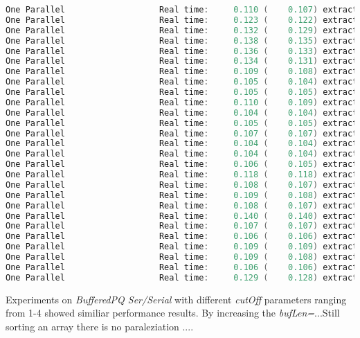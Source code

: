 \documentclass[format=acmsmall, review=false, screen=true]{acmart}
\begin{document}
\begin{lstlisting}[language=java]
One Parallel                   Real time:     0.110 (    0.107) extract: 1666666
One Parallel                   Real time:     0.123 (    0.122) extract: 1250000
One Parallel                   Real time:     0.132 (    0.129) extract: 1000000
One Parallel                   Real time:     0.138 (    0.135) extract: 833333
One Parallel                   Real time:     0.136 (    0.133) extract: 714285
One Parallel                   Real time:     0.134 (    0.131) extract: 625000
One Parallel                   Real time:     0.109 (    0.108) extract: 555555
One Parallel                   Real time:     0.105 (    0.104) extract: 500000
One Parallel                   Real time:     0.105 (    0.105) extract: 454545
One Parallel                   Real time:     0.110 (    0.109) extract: 416666
One Parallel                   Real time:     0.104 (    0.104) extract: 384615
One Parallel                   Real time:     0.105 (    0.105) extract: 357142
One Parallel                   Real time:     0.107 (    0.107) extract: 333333
One Parallel                   Real time:     0.104 (    0.104) extract: 312500
One Parallel                   Real time:     0.104 (    0.104) extract: 294117
One Parallel                   Real time:     0.106 (    0.105) extract: 277777
One Parallel                   Real time:     0.118 (    0.118) extract: 263157
One Parallel                   Real time:     0.108 (    0.107) extract: 250000
One Parallel                   Real time:     0.109 (    0.108) extract: 238095
One Parallel                   Real time:     0.108 (    0.107) extract: 227272
One Parallel                   Real time:     0.140 (    0.140) extract: 217391
One Parallel                   Real time:     0.107 (    0.107) extract: 208333
One Parallel                   Real time:     0.106 (    0.106) extract: 200000
One Parallel                   Real time:     0.109 (    0.109) extract: 192307
One Parallel                   Real time:     0.109 (    0.108) extract: 185185
One Parallel                   Real time:     0.106 (    0.106) extract: 178571
One Parallel                   Real time:     0.129 (    0.128) extract: 172413
\end{lstlisting}

Experiments on \emph{BufferedPQ Ser/Serial } with different \emph{cutOff} parameters ranging from 1-4 showed similiar performance results. By increasing the \emph{bufLen=}...Still sorting an array there is no paraleziation .... 
\end{document}
